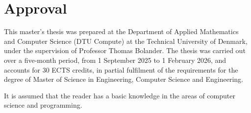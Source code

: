 \section*{Approval}
This master’s thesis was prepared at the Department of Applied Mathematics and Computer Science (DTU Compute) at the Technical University of Denmark, under the supervision of Professor Thomas Bolander. The thesis was carried out over a five-month period, from 1 September 2025 to 1 February 2026, and accounts for 30 ECTS credits, in partial fulfilment of the requirements for the degree of Master of Science in Engineering, Computer Science and Engineering.

It is assumed that the reader has a basic knowledge in the areas of computer science and programming.

\vfill

\begin{center}
\namesigdate{\thesisauthor~-~\studentnumber}
\end{center}

\vfill


